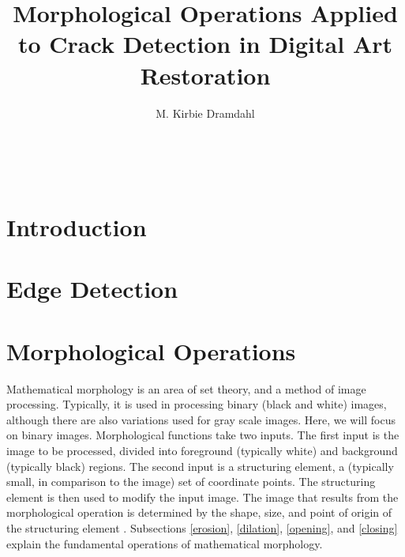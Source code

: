 \documentclass{sig-alternate}
\begin{document}

\title{Morphological Operations Applied to Crack Detection in Digital Art Restoration}


\author{
\alignauthor
M. Kirbie Dramdahl\\
	\\
	\\
	\\
}

\maketitle
\begin{abstract}
\end{abstract}




\section{Introduction}

\section{Edge Detection}\label{edge detection}

\section{Morphological Operations}
Mathematical morphology is an area of set theory, and a method of image processing. Typically, it is used in processing binary (black and white) images, although there are also variations used for gray scale images. Here, we will focus on binary images. Morphological functions take two inputs. The first input is the image to be processed, divided into foreground (typically white) and background (typically black) regions. The second input is a structuring element, a (typically small, in comparison to the image) set of coordinate points. The structuring element is then used to modify the input image. The image that results from the morphological operation is determined by the shape, size, and point of origin of the structuring element \cite{MorphologyWikiAnonymous, MorphologyBook:2000, MorphologyWiki, MorphologyPaper:1987}. Subsections \ref{erosion}, \ref{dilation}, \ref{opening}, and \ref{closing} explain the fundamental operations of mathematical morphology.
\end{document}
